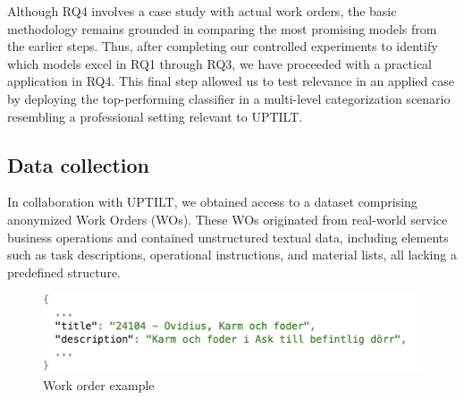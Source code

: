 Although RQ4 involves a case study with actual work orders, the basic methodology remains grounded in comparing the most promising models from the earlier steps. Thus, after completing our controlled experiments to identify which models excel in RQ1 through RQ3, we have proceeded with a practical application in RQ4. This final step allowed us to test  relevance in an applied case by deploying the top-performing classifier in a multi-level categorization scenario resembling a professional setting relevant to UPTILT.


\subsection{Data collection}
%

In collaboration with UPTILT, we obtained access to a dataset comprising anonymized Work Orders (WOs). These WOs originated from real-world service business operations and contained unstructured textual data, including elements such as task descriptions, operational instructions, and material lists, all lacking a predefined structure.
\begin{figure}[h!]
    \centering
    \includegraphics[width=1\linewidth]{img/fig4.png}
    \caption{Work order example}
    \label{fig:enter-label}
\end{figure}

